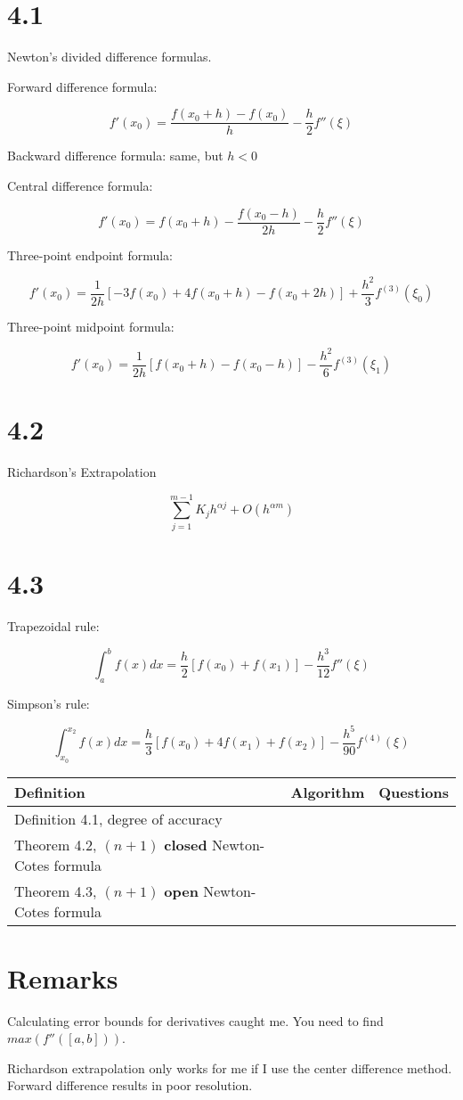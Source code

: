 \documentclass{article}
\begin{document}
\section*{4.1}

Newton's divided difference formulas.

Forward difference formula:

$$f'(x_0)=\frac{f(x_0+h) - f(x_0)}{h} - \frac{h}{2}f''(\xi)$$

Backward difference formula:  same, but $h < 0$

Central difference formula:

$$f'(x_0)=f(x_0 + h) - \frac{f(x_0-h)}{2h} - \frac{h}{2}f''(\xi)$$

Three-point endpoint formula:

$$f'(x_0)=\frac{1}{2h}[-3f(x_0)+4f(x_0+h)-f(x_0+2h)]+\frac{h^2}{3}f^{(3)}(\xi_0)$$

Three-point midpoint formula:

$$f'(x_0)=\frac{1}{2h}[f(x_0+h)-f(x_0-h)]-\frac{h^2}{6}f^{(3)}(\xi_1)$$

\section*{4.2}

Richardson's Extrapolation

$$\sum_{j=1}^{m-1} K_j h^{\alpha j} + O(h^{\alpha m})$$

\section*{4.3}

Trapezoidal rule:

$$\int_a^b f(x)dx=\frac{h}{2}[f(x_0)+f(x_1)] - \frac{h^3}{12} f''(\xi)$$

Simpson's rule:

$$\int_{x_0}^{x_2} f(x)dx= \frac{h}{3}[f(x_0) + 4f(x_1)+f(x_2)]- \frac{h^5}{90}f^{(4)}(\xi)$$

\begin{tabularx}{\textwidth}{ |X|c|c| }
    \hline
	{\bf Definition} & {\bf Algorithm} & {\bf Questions} \\
    \hline
	Definition 4.1, degree of accuracy & & \\
    \hline
	Theorem 4.2, $(n+1)$ \textbf{closed} Newton-Cotes formula & & \\
    \hline
	Theorem 4.3, $(n+1)$ \textbf{open} Newton-Cotes formula & & \\
    \hline
\end{tabularx}

\section*{Remarks}

Calculating error bounds for derivatives caught me.
You need to find $max(f''([a,b]))$.

Richardson extrapolation only works for me if I use the center difference method.
Forward difference results in poor resolution.
\end{document}
